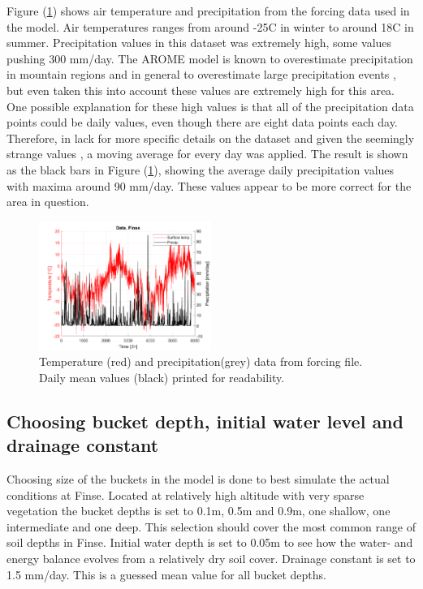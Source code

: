 \documentclass[a4paper,11pt,twocolumn]{article}
\begin{document}
Figure (\ref{fig:forcing}) shows air temperature and precipitation from the forcing data used in the model. Air temperatures ranges from around -25\textdegree C in winter to around 18\textdegree C in summer. Precipitation values in this dataset was extremely high, some values pushing 300 mm/day. The AROME model is known to overestimate precipitation in mountain regions and in general to overestimate large precipitation events \cite{muller}, but even taken this into account these values are extremely high for this area. One possible explanation for these high values is that all of the precipitation data points could be daily values, even though there are eight data points each day.  Therefore, in lack for more specific details on the dataset and given the seemingly strange values , a moving average for every day was applied. The result is shown as the black bars in Figure (\ref{fig:forcing}), showing the average daily precipitation values with maxima around 90 mm/day. These values appear to be more correct for the area in question.   

\begin{figure}[h]
	\centering 
	\includegraphics[width=0.5\textwidth]{figures/precip}
	\caption{Temperature (red) and precipitation(grey) data from forcing file. Daily mean values (black) printed for readability.}
	\label{fig:forcing}
\end{figure}


\subsection{Choosing bucket depth, initial water level and drainage constant}
Choosing size of the buckets in the model is done to best simulate the actual conditions at Finse. Located at relatively high altitude with very sparse vegetation the bucket depths is set to 0.1m, 0.5m and 0.9m, one shallow, one intermediate and one deep. This selection should cover the most common range of soil depths in Finse. Initial water depth is set to 0.05m to see how the water- and energy balance evolves from a relatively dry soil cover. Drainage constant is set to 1.5 mm/day. This is a guessed mean value for all bucket depths.    
\end{document}
